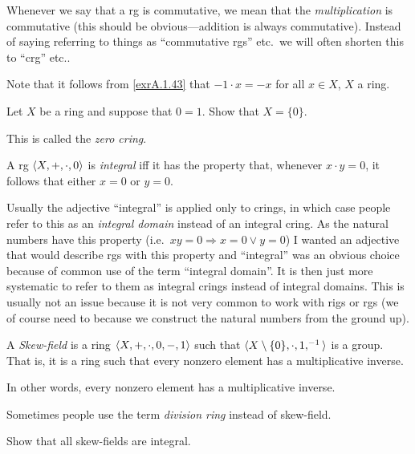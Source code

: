 \begin{rmk}
Whenever we say that a rg is commutative, we mean that the \emph{multiplication} is commutative (this should be obvious---addition is always commutative).  Instead of saying referring to things as ``commutative rgs'' etc.~we will often shorten this to ``crg'' etc..
\end{rmk}
\begin{rmk}
Note that it follows from \cref{exrA.1.43} that $-1\cdot x=-x$ for all $x\in X$, $X$ a ring.
\end{rmk}
\begin{exr}
Let $X$ be a ring and suppose that $0=1$.  Show that $X=\{ 0\}$.
\begin{rmk}
This is called the \emph{zero cring}.
\end{rmk}
\end{exr}
\begin{dfn}[Integral]\label{dfnA.1.69}
A rg $\langle X,+,\cdot ,0\rangle$ is \emph{integral} iff it has the property that, whenever $x\cdot y=0$, it follows that either $x=0$ or $y=0$.
\begin{rmk}
Usually the adjective ``integral'' is applied only to crings, in which case people refer to this as an \emph{integral domain} instead of an integral cring.  As the natural numbers have this property (i.e.~$xy=0\Rightarrow x=0\vee y=0$) I wanted an adjective that would describe rgs with this property and ``integral'' was an obvious choice because of common use of the term ``integral domain''.  It is then just more systematic to refer to them as integral crings instead of integral domains.  This is usually not an issue because it is not very common to work with rigs or rgs (we of course need to because we construct the natural numbers from the ground up).
\end{rmk}
\end{dfn}
\begin{dfn}
A \emph{Skew-field} is a ring $\langle X,+,\cdot ,0,-,1\rangle$ such that $\langle X\setminus \{ 0\} ,\cdot ,1,^{-1}\rangle$ is a group.  That is, it is a ring such that every nonzero element has a multiplicative inverse.
\begin{rmk}
In other words, every nonzero element has a multiplicative inverse.
\end{rmk}
\begin{rmk}
Sometimes people use the term \emph{division ring} instead of skew-field.
\end{rmk}
\begin{exr}
Show that all skew-fields are integral.
\end{exr}
\end{dfn}
